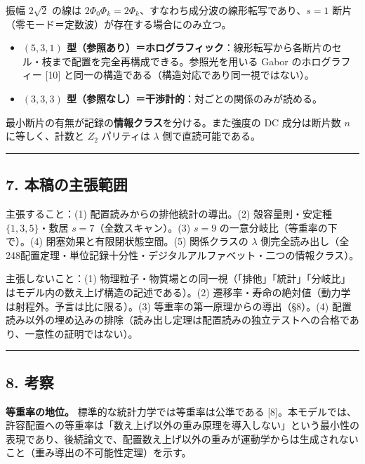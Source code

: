 \documentclass[
]{ltjsarticle}
\providecommand{\tightlist}{%
  \setlength{\itemsep}{0pt}\setlength{\parskip}{0pt}}
\begin{document}
振幅 \(2\sqrt2\) の線は
\(2\Phi_0\Phi_k=2\Phi_k\)、すなわち成分波の線形転写であり、\(s=1\)
断片（零モード＝定数波）が存在する場合にのみ立つ。

\begin{itemize}
\tightlist
\item
  \textbf{\((5,3,1)\)
  型（参照あり）＝ホログラフィック}：線形転写から各断片のセル・枝まで配置を完全再構成できる。参照光を用いる
  Gabor のホログラフィー {[}10{]}
  と同一の構造である（構造対応であり同一視ではない）。
\item
  \textbf{\((3,3,3)\)
  型（参照なし）＝干渉計的}：対ごとの関係のみが読める。
\end{itemize}

最小断片の有無が記録の\textbf{情報クラス}を分ける。また強度の DC
成分は断片数 \(n\) に等しく、計数と \(Z_2\) パリティは \(\lambda\)
側で直読可能である。

\begin{center}\rule{0.5\linewidth}{0.5pt}\end{center}

\subsection{7.
本稿の主張範囲}\label{ux672cux7a3fux306eux4e3bux5f35ux7bc4ux56f2}

主張すること：(1) 配置読みからの排他統計の導出。(2) 殻容量則・安定種
\(\{1,3,5\}\)・敷居 \(s=7\)（全数スキャン）。(3) \(s=9\)
の一意分岐比（等重率の下で）。(4) 閉塞効果と有限閉状態空間。(5)
関係クラスの \(\lambda\)
側完全読み出し（全248配置定理・単位記録十分性・デジタルアルファベット・二つの情報クラス）。

主張しないこと：(1)
物理粒子・物質場との同一視（「排他」「統計」「分岐比」はモデル内の数え上げ構造の記述である）。(2)
遷移率・寿命の絶対値（動力学は射程外。予言は比に限る）。(3)
等重率の第一原理からの導出（§8）。(4)
配置読み以外の埋め込みの排除（読み出し定理は配置読みの独立テストへの合格であり、一意性の証明ではない）。

\begin{center}\rule{0.5\linewidth}{0.5pt}\end{center}

\subsection{8. 考察}\label{ux8003ux5bdf}

\textbf{等重率の地位。} 標準的な統計力学では等重率は公準である
{[}8{]}。本モデルでは、許容配置への等重率は「数え上げ以外の重み原理を導入しない」という最小性の表現であり、後続論文で、配置数え上げ以外の重みが運動学からは生成されないこと（重み導出の不可能性定理）を示す。
\end{document}
